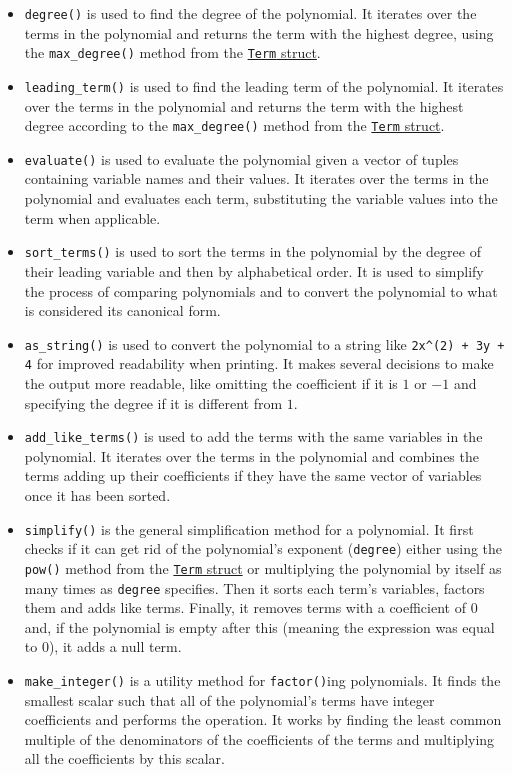 \begin{itemize}
    \item \verb|degree()| is used to find the degree of the polynomial. It iterates over the terms in the polynomial and returns the term with the highest degree, using the \verb|max_degree()| method from the \hyperref[lst:term-max-degree]{\texttt{Term} struct}.
    \item \verb|leading_term()| is used to find the leading term of the polynomial. It iterates over the terms in the polynomial and returns the term with the highest degree according to the \verb|max_degree()| method from the \hyperref[lst:term-max-degree]{\texttt{Term} struct}.
    \item \verb|evaluate()| is used to evaluate the polynomial given a vector of tuples containing variable names and their values. It iterates over the terms in the polynomial and evaluates each term, substituting the variable values into the term when applicable.
    \item \verb|sort_terms()| is used to sort the terms in the polynomial by the degree of their leading variable and then by alphabetical order. It is used to simplify the process of comparing polynomials and to convert the polynomial to what is considered its canonical form.
    \item \verb|as_string()| is used to convert the polynomial to a string like \verb|2x^(2) + 3y + 4| for improved readability when printing. It makes several decisions to make the output more readable, like omitting the coefficient if it is $1$ or $-1$ and specifying the degree if it is different from $1$.
    \item \verb|add_like_terms()| is used to add the terms with the same variables in the polynomial. It iterates over the terms in the polynomial and combines the terms adding up their coefficients if they have the same vector of variables once it has been sorted.
    \item \verb|simplify()| is the general simplification method for a polynomial. It first checks if it can get rid of the polynomial's exponent (\verb|degree|) either using the \verb|pow()| method from the \hyperref[lst:term-pow]{\texttt{Term} struct} or multiplying the polynomial by itself as many times as \verb|degree| specifies. Then it sorts each term's variables, factors them and adds like terms. Finally, it removes terms with a coefficient of $0$ and, if the polynomial is empty after this (meaning the expression was equal to $0$), it adds a null term.
    \item \verb|make_integer()| is a utility method for \verb|factor()|ing polynomials. It finds the smallest scalar such that all of the polynomial's terms have integer coefficients and performs the operation. It works by finding the least common multiple of the denominators of the coefficients of the terms and multiplying all the coefficients by this scalar. 

\end{itemize}
